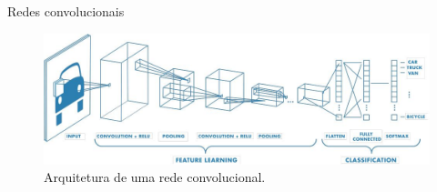 \documentclass[8pt]{beamer}
\begin{document}
\begin{frame}{Redes convolucionais}
        \begin{figure}[!ht]
            \centering
            \includegraphics[width=0.95\columnwidth]{
                Imagens/CNN_mathworks.jpg
            }
            \caption{Arquitetura de uma rede convolucional. }
            \label{fig:cnn}
        \end{figure}





\end{frame}
\end{document}
